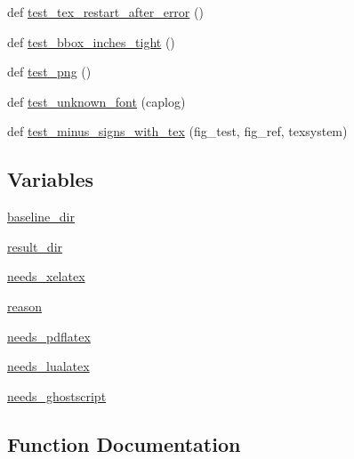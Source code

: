 \begin{DoxyCompactItemize}
\item 
def \hyperlink{namespacematplotlib_1_1tests_1_1test__backend__pgf_ab644c48e1f8c3832716b9259472cd024}{test\+\_\+tex\+\_\+restart\+\_\+after\+\_\+error} ()
\item 
def \hyperlink{namespacematplotlib_1_1tests_1_1test__backend__pgf_a81976ac1459a7ebca67e1089d27c5d6f}{test\+\_\+bbox\+\_\+inches\+\_\+tight} ()
\item 
def \hyperlink{namespacematplotlib_1_1tests_1_1test__backend__pgf_a2ac49fc9f54c6fd20bffcce2df102b9b}{test\+\_\+png} ()
\item 
def \hyperlink{namespacematplotlib_1_1tests_1_1test__backend__pgf_ad8666595416dd7f738714889e91e7a03}{test\+\_\+unknown\+\_\+font} (caplog)
\item 
def \hyperlink{namespacematplotlib_1_1tests_1_1test__backend__pgf_a9acb1ecbcc9d173f191d3bcfb8e48279}{test\+\_\+minus\+\_\+signs\+\_\+with\+\_\+tex} (fig\+\_\+test, fig\+\_\+ref, texsystem)
\end{DoxyCompactItemize}
\subsection*{Variables}
\begin{DoxyCompactItemize}
\item 
\hyperlink{namespacematplotlib_1_1tests_1_1test__backend__pgf_a8896cb4d9fd1691162ec441f7d872ede}{baseline\+\_\+dir}
\item 
\hyperlink{namespacematplotlib_1_1tests_1_1test__backend__pgf_a93ce0ca93d4c24b1003431e530273b42}{result\+\_\+dir}
\item 
\hyperlink{namespacematplotlib_1_1tests_1_1test__backend__pgf_ac06a748bc75b0c069d0ed61fcbc5a14e}{needs\+\_\+xelatex}
\item 
\hyperlink{namespacematplotlib_1_1tests_1_1test__backend__pgf_aa430c65a6e91c3a65cd4c7d6c4b15d0d}{reason}
\item 
\hyperlink{namespacematplotlib_1_1tests_1_1test__backend__pgf_a6c2764acaaac7568ca9e08b13fbb0c22}{needs\+\_\+pdflatex}
\item 
\hyperlink{namespacematplotlib_1_1tests_1_1test__backend__pgf_a5846cfe39e6571c07c2e6ced875cb7c5}{needs\+\_\+lualatex}
\item 
\hyperlink{namespacematplotlib_1_1tests_1_1test__backend__pgf_a30588d5fd83787a3e9f6b7c89032ffaf}{needs\+\_\+ghostscript}
\end{DoxyCompactItemize}


\subsection{Function Documentation}
\mbox{\label{namespacematplotlib_1_1tests_1_1test__backend__pgf_a4b86e539ef1b961f77ff21dccc933835}} 
